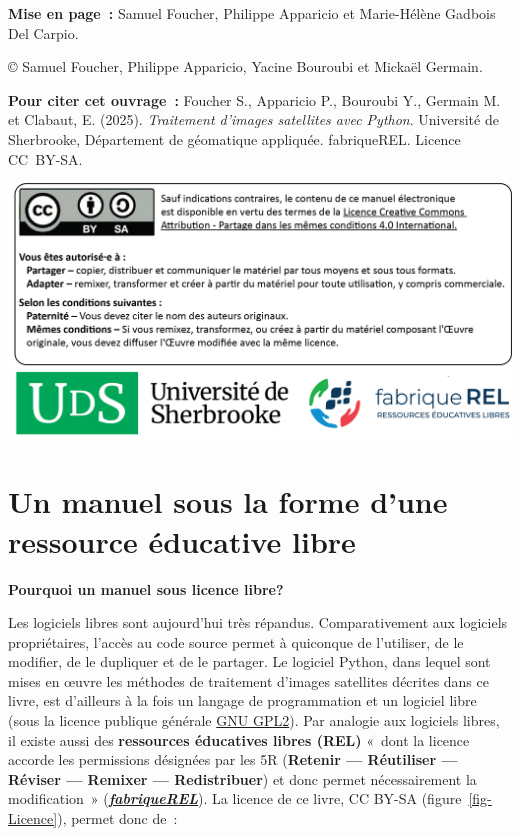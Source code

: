 \documentclass[
  11pt,
  letterpaper,
  open=any,
  twoside=false,
  french]{scrbook}
\begin{document}
\textbf{Mise en page~:} Samuel Foucher, Philippe Apparicio et
Marie-Hélène Gadbois Del Carpio.

© Samuel Foucher, Philippe Apparicio, Yacine Bouroubi et Mickaël
Germain.

\textbf{Pour citer cet ouvrage~:} Foucher S., Apparicio P., Bouroubi Y.,
Germain M. et Clabaut, E. (2025). \emph{Traitement d'images satellites
avec Python}. Université de Sherbrooke, Département de géomatique
appliquée. fabriqueREL. Licence CC~BY-SA.

\includegraphics[width=0.8\linewidth,height=\textheight,keepaspectratio]{images/introduction/CouvertureP2.png}\hfill

\section*{Un manuel sous la forme d'une ressource éducative
libre}\label{sect001}


\textbf{Pourquoi un manuel sous licence libre?}

Les logiciels libres sont aujourd'hui très répandus. Comparativement aux
logiciels propriétaires, l'accès au code source permet à quiconque de
l'utiliser, de le modifier, de le dupliquer et de le partager. Le
logiciel Python, dans lequel sont mises en œuvre les méthodes de
traitement d'images satellites décrites dans ce livre, est d'ailleurs à
la fois un langage de programmation et un logiciel libre (sous la
licence publique générale
\href{https://fr.wikipedia.org/wiki/Licence_publique_g\%C3\%A9n\%C3\%A9rale_GNU}{GNU
GPL2}). Par analogie aux logiciels libres, il existe aussi des
\textbf{ressources éducatives libres (REL)} «~dont la licence accorde
les permissions désignées par les 5R (\textbf{Retenir --- Réutiliser ---
Réviser --- Remixer --- Redistribuer}) et donc permet nécessairement la
modification~»
(\href{https://fabriquerel.org/rel/}{\textbf{\emph{fabriqueREL}}}). La
licence de ce livre, CC BY-SA (figure~\ref{fig-Licence}), permet donc
de~:
\end{document}
